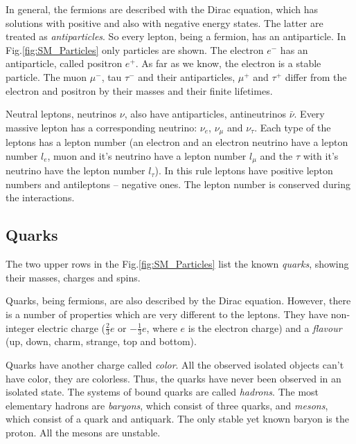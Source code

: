 In general, the fermions are described with the Dirac equation\cite{diraceq}, which has 
% 
% 
solutions with positive and also with negative energy states. The latter are treated
as \textit{antiparticles}. So every lepton, being a fermion, has an antiparticle. In Fig.\ref{fig:SM_Particles}
only particles are shown. The electron $e^{-}$ has an antiparticle, called positron $e^{+}$. As far as we know,
the electron is a stable particle. The muon $\mu^{-}$, tau $\tau^{-}$ and
their antiparticles, $\mu^{+}$ and $\tau^{+}$ differ from the electron and positron by their masses and their finite lifetimes.

Neutral leptons, neutrinos $\nu$, also have antiparticles, antineutrinos $\bar{\nu}$. Every massive lepton has a corresponding
neutrino: $\nu_{e}$, $\nu_{\mu}$ and $\nu_{\tau}$. Each type of the leptons has a lepton number (an electron and an electron neutrino 
have a lepton number $l_{e}$, muon and it's neutrino have a lepton number $l_{\mu}$ and the $\tau$ with it's neutrino have the 
lepton number $l_{\tau}$).  In this rule leptons have positive lepton numbers and
antileptons -- negative ones. The lepton number is conserved during the interactions.

\subsection{Quarks}\label{sec:quark}

The two upper rows in the Fig.\ref{fig:SM_Particles} list the known \textit{quarks}, showing their masses, charges and spins.

Quarks, being fermions, are also described by the Dirac equation. However, there is a number of properties which are very different
to the leptons. They have non-integer electric charge ($\frac{2}{3} e$ or $-\frac{1}{3} e$, where $e$ is the electron charge) and a 
\textit{flavour} (up, down, charm, strange, top and bottom).

Quarks have another charge called \textit{color}. All the observed isolated objects can't have color, they are colorless. Thus, the 
quarks have never been observed in an isolated state. The systems of bound quarks are called \textit{hadrons}. The most elementary hadrons are 
\textit{baryons}, which consist of three quarks, and \textit{mesons}, which consist of a quark and antiquark. The only stable yet known baryon 
is the proton. All the mesons are unstable.

